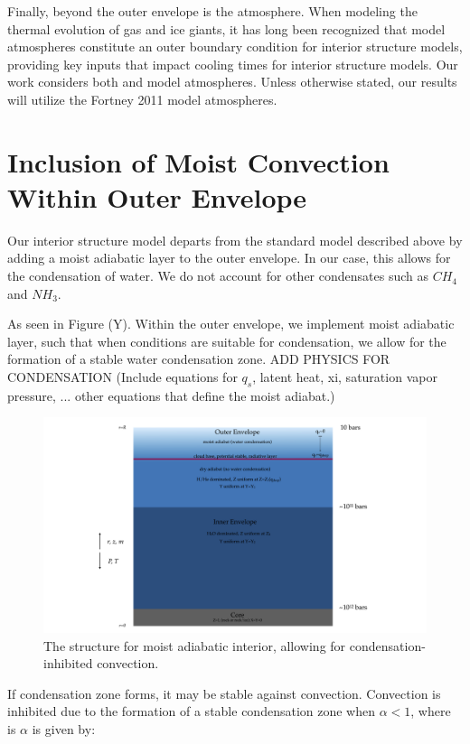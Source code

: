 \documentclass[11pt]{ucscthesisbs}
\begin{document}
Finally, beyond the outer envelope is the atmosphere. When modeling the thermal evolution of gas and ice giants, it has long been recognized that model atmospheres constitute an outer boundary condition for interior structure models, providing key inputs that impact cooling times for interior structure models. Our work considers both \citep{graboske_1975} and \citep{fortney_2011} model atmospheres. Unless otherwise stated, our results will utilize the Fortney 2011 model atmospheres. 


\section{Inclusion of Moist Convection Within Outer Envelope}
Our interior structure model departs from the standard model described above by adding a moist adiabatic layer to the outer envelope. In our case, this allows for the condensation of water. We do not account for other condensates such as $CH_{4}$ and $NH_{3}$.

As seen in Figure (Y).   Within the outer envelope, we implement moist adiabatic layer, such that when conditions are suitable for condensation, we allow for the formation of a stable water condensation zone. ADD PHYSICS FOR CONDENSATION (Include equations for $q_{s}$, latent heat, xi, saturation vapor pressure, ... other equations that define the moist adiabat.)

\begin{figure}[ht!]
 \centerline{
  \includegraphics[width=8.0in]{figures/moist_adiabat_structure.png}
 }
\caption[Interior Structure for Moist Adiabat]
{The structure for moist adiabatic interior, allowing for condensation-inhibited convection.}
\label{fig:moist_interior}
\end{figure}


If condensation zone forms, it may be stable against convection. Convection is inhibited due to the formation of a stable condensation zone when $\alpha < 1$, where is $\alpha$ \citep{friedson_2017} is given by:
\end{document}
